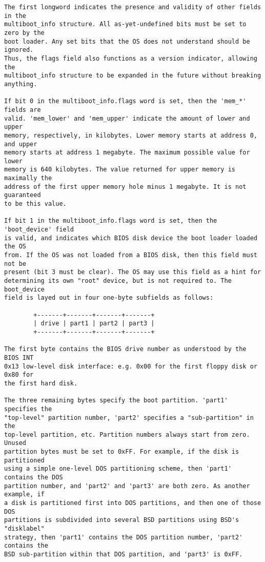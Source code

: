\begin{verbatim}
The first longword indicates the presence and validity of other fields in the
multiboot_info structure. All as-yet-undefined bits must be set to zero by the
boot loader. Any set bits that the OS does not understand should be ignored.
Thus, the flags field also functions as a version indicator, allowing the
multiboot_info structure to be expanded in the future without breaking
anything.

If bit 0 in the multiboot_info.flags word is set, then the 'mem_*' fields are
valid. 'mem_lower' and 'mem_upper' indicate the amount of lower and upper
memory, respectively, in kilobytes. Lower memory starts at address 0, and upper
memory starts at address 1 megabyte. The maximum possible value for lower
memory is 640 kilobytes. The value returned for upper memory is maximally the
address of the first upper memory hole minus 1 megabyte. It is not guaranteed
to be this value.

If bit 1 in the multiboot_info.flags word is set, then the 'boot_device' field
is valid, and indicates which BIOS disk device the boot loader loaded the OS
from. If the OS was not loaded from a BIOS disk, then this field must not be
present (bit 3 must be clear). The OS may use this field as a hint for
determining its own "root" device, but is not required to. The boot_device
field is layed out in four one-byte subfields as follows:

        +-------+-------+-------+-------+
        | drive | part1 | part2 | part3 |
        +-------+-------+-------+-------+

The first byte contains the BIOS drive number as understood by the BIOS INT
0x13 low-level disk interface: e.g. 0x00 for the first floppy disk or 0x80 for
the first hard disk.

The three remaining bytes specify the boot partition. 'part1' specifies the
"top-level" partition number, 'part2' specifies a "sub-partition" in the
top-level partition, etc. Partition numbers always start from zero. Unused
partition bytes must be set to 0xFF. For example, if the disk is partitioned
using a simple one-level DOS partitioning scheme, then 'part1' contains the DOS
partition number, and 'part2' and 'part3' are both zero. As another example, if
a disk is partitioned first into DOS partitions, and then one of those DOS
partitions is subdivided into several BSD partitions using BSD's "disklabel"
strategy, then 'part1' contains the DOS partition number, 'part2' contains the
BSD sub-partition within that DOS partition, and 'part3' is 0xFF.


\end{verbatim}
